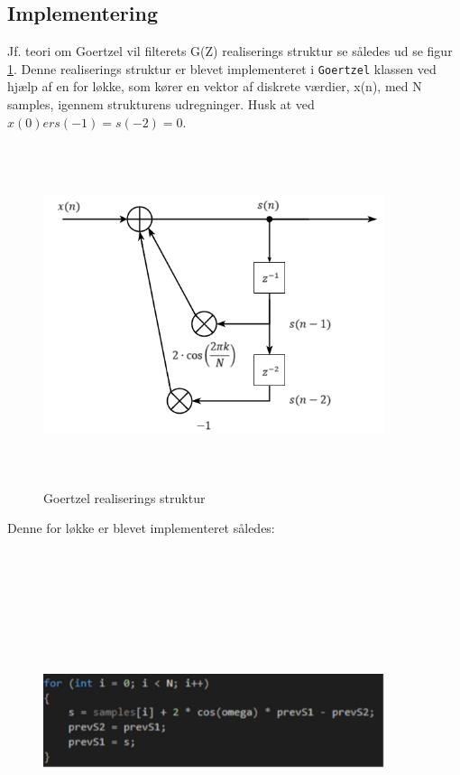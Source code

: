 \subsection{Implementering}
Jf. teori om Goertzel vil filterets G(Z) realiserings struktur se således ud se figur \ref{fig:grs}. Denne realiserings struktur er blevet implementeret i \texttt{Goertzel} klassen ved hjælp af en for løkke, som kører en vektor af diskrete værdier, x(n), med N samples, igennem strukturens udregninger. Husk at ved $x(0) er s(-1) = s(-2) = 0$.
\begin{figure}[ht]
	\centering
	\includegraphics[width=10cm,height=10cm,keepaspectratio]{pictures/GRStruktur.png}
	\caption{Goertzel realiserings struktur}
	\label{fig:grs}
\end{figure} 
\newline
Denne for løkke er blevet implementeret således:
\begin{figure}[ht]
	\centering
	\includegraphics[width=10cm,height=10cm,keepaspectratio]{pictures/Forloop.png}
	\label{fig:forloop}
\end{figure} 
